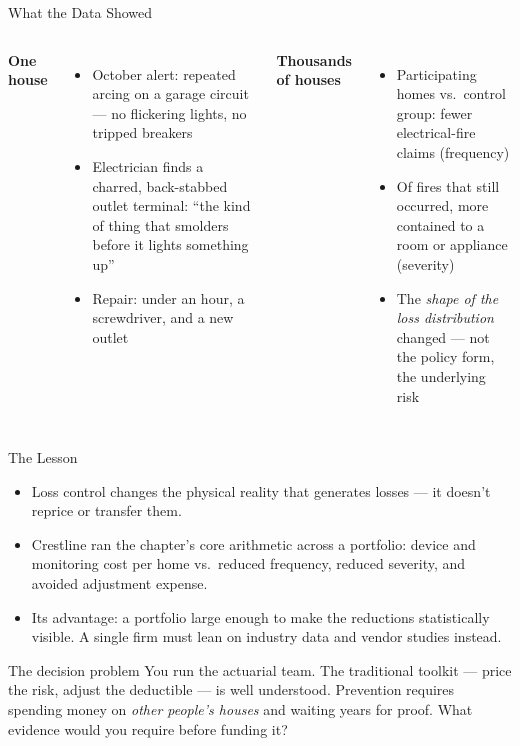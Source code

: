 \documentclass[11pt, aspectratio=169]{beamer}
\begin{document}
\begin{frame}{What the Data Showed}
\begin{columns}[T]
\textbf{One house}
\begin{itemize}
  \item October alert: repeated arcing on a garage circuit --- no flickering lights, no tripped breakers
  \item Electrician finds a charred, back-stabbed outlet terminal: ``the kind of thing that smolders before it lights something up''
  \item Repair: under an hour, a screwdriver, and a new outlet
\end{itemize}
\textbf{Thousands of houses}
\begin{itemize}
  \item Participating homes vs.\ control group: fewer electrical-fire claims (\alert{frequency})
  \item Of fires that still occurred, more contained to a room or appliance (\alert{severity})
  \item The \emph{shape of the loss distribution} changed --- not the policy form, the underlying risk
\end{itemize}
\end{columns}
\end{frame}

\begin{frame}{The Lesson}
\begin{itemize}
  \item Loss control changes the physical reality that generates losses --- it doesn't reprice or transfer them.
  \item Crestline ran the chapter's core arithmetic across a portfolio: device and monitoring cost per home vs.\ reduced frequency, reduced severity, and avoided adjustment expense.
  \item Its advantage: a portfolio large enough to make the reductions statistically visible. A single firm must lean on industry data and vendor studies instead.
\end{itemize}
\medskip
\begin{block}{The decision problem}
You run the actuarial team. The traditional toolkit --- price the risk, adjust the deductible --- is well understood. Prevention requires spending money on \emph{other people's houses} and waiting years for proof. What evidence would you require before funding it?
\end{block}
\end{frame}
\end{document}
